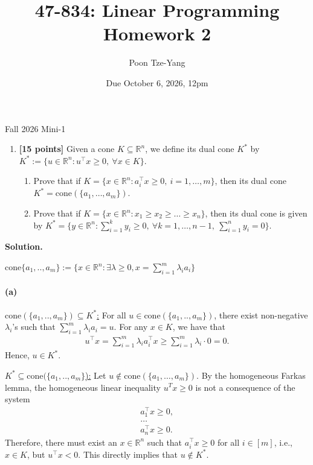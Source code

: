 \documentclass[11pt,letterpaper]{article}
\title{47-834: Linear Programming \\ Homework 2}
\author{Poon Tze-Yang}
\date{Due October 6, 2026, 12pm}
\theoremstyle{definition}
\newcommand{\reals}{\mathbb{R}}
\newcommand{\cone}{\mathrm{cone}}
\newcommand{\solution}{\medskip\noindent\textbf{Solution.}\par\medskip}
\begin{document}
\maketitle

\noindent Fall 2026 Mini-1

\begin{enumerate}[series=q]
\item \textbf{[15 points]} Given a cone $K \subseteq \reals^n$, we define its dual cone $K^*$ by $K^* := \{u \in \reals^n : u^\top x \geq 0, \ \forall x \in K\}$.
\begin{enumerate}
\item Prove that if $K = \{x \in \reals^n : a_i^\top x \geq 0, \ i = 1, \ldots, m\}$, then its dual cone $K^* = \mathrm{cone}(\{a_1, \ldots, a_m\})$.
\item Prove that if $K = \{x \in \reals^n : x_1 \geq x_2 \geq \ldots \geq x_n\}$, then its dual cone is given by $K^* = \{y \in \reals^n : \sum_{i=1}^k y_i \geq 0, \ \forall k = 1, \ldots, n-1, \ \sum_{i=1}^n y_i = 0\}$.
\end{enumerate}
\end{enumerate}

\solution
$\cone\{a_1,..,a_m\} := \{x\in \reals^n : \exists \lambda\geq 0, x = \sum_{i=1}^m\lambda_i a_i\}$ 

\paragraph{(a)}
\ul{$\cone(\{a_1,..,a_m\})\subseteq K^*$:}
For all $u\in \cone(\{a_1,..,a_m\})$, there exist non-negative $\lambda_i$'s such that $\sum_{i=1}^m\lambda_i a_i = u$.
For any $x\in K$, we have that
\begin{align*}
    u^\top x = \sum_{i=1}^m\lambda_i a_i^\top x \geq \sum_{i=1}^m\lambda_i\cdot 0 = 0.
\end{align*}
Hence, $u\in K^*$.

\ul{$K^*\subseteq \cone(\{a_1,..,a_m\}$):} 
Let $u\notin \cone(\{a_1,\dots,a_m\})$.
By the homogeneous Farkas lemma, the homogeneous linear inequality $u^Tx\geq 0$ is not a consequence of the system
\begin{align*}
    a_1^\top x\geq 0,\\
    \dots  \\
    a_n^\top x\geq 0.
\end{align*}
Therefore, there must exist an $x\in \reals^n$ such that $a_i^\top x\geq 0$ for all $i\in [m]$, i.e., $x\in K$, but $u^\top x<0$.
This directly implies that $u\notin K^*$.
\end{document}
